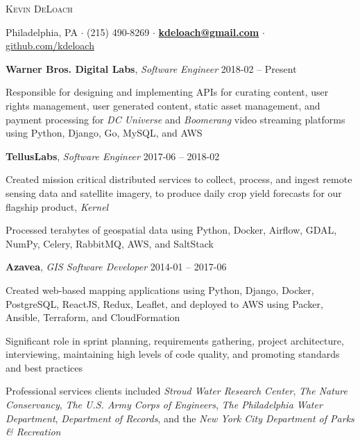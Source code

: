 \documentclass[12pt,a4paper]{article}
\newcommand{\sectionhead}{\normalfont\normalsize\scshape}
\newcommand{\workhead}[3]{\textbf{#1}, \emph{#2} \hfill #3}
\newcommand{\li}{\item[--]}
\begin{document}
\begin{center}
\noindent
{\huge\textsc{Kevin DeLoach}}

\vspace{2mm}

\noindent
Philadelphia, PA
$\cdot$
(215) 490-8269
$\cdot$
\href{mailto:kdeloach@gmail.com}{\bfseries kdeloach@gmail.com}
$\cdot$
\href{https://github.com/kdeloach}{github.com/kdeloach}
\end{center}
\hline

\begin{description}[leftmargin=0em]
    \itemsep0pt
    \parskip3pt
    \item
        \workhead{Warner Bros. Digital Labs}{Software Engineer}{2018-02 -- Present}
        \begin{itemize*}
            \li Responsible for designing and implementing APIs for curating content, user rights management, user generated content, static asset management, and payment processing for \emph{DC Universe} and \emph{Boomerang} video streaming platforms using Python, Django, Go, MySQL, and AWS
        \end{itemize*}
    \item
        \workhead{TellusLabs}{Software Engineer}{2017-06 -- 2018-02}
        \begin{itemize*}
            \li Created mission critical distributed services to collect, process, and ingest remote sensing data and satellite imagery, to produce daily crop yield forecasts for our flagship product, \emph{Kernel}
            \li Processed terabytes of geospatial data using Python, Docker, Airflow, GDAL, NumPy, \mbox{Celery}, RabbitMQ, AWS, and SaltStack
        \end{itemize*}
    \item
        \workhead{Azavea}{GIS Software Developer}{2014-01 -- 2017-06}
        \begin{itemize*}
            \li Created web-based mapping applications using Python, Django, Docker, PostgreSQL, \mbox{ReactJS}, Redux, Leaflet, and deployed to AWS using Packer, Ansible, Terraform, and CloudFormation
            \li Significant role in sprint planning, requirements gathering, project architecture, interviewing, maintaining high levels of code quality, and promoting standards and best practices
            \li Professional services clients included \emph{Stroud Water Research Center}, \emph{The Nature Conservancy}, \emph{The U.S. Army Corps of Engineers}, \emph{The Philadelphia Water Department}, \emph{Department of Records}, and the \emph{New York City Department of Parks \& Recreation}

\end{itemize*}
\end{description}
\end{document}
